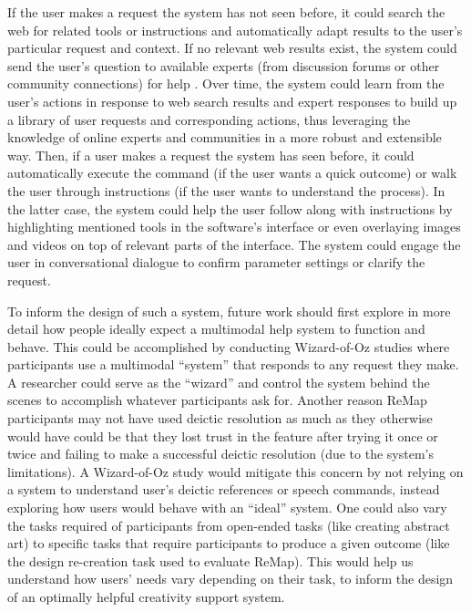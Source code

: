 If the user makes a request the system has not seen before, it could search the web for related tools or instructions and automatically adapt results to the user's particular request and context. If no relevant web results exist, the system could send the user's question to available experts (from discussion forums or other community connections) for help \cite{Ackerman1990, Chen2017, Kim2012}. Over time, the system could learn from the user's actions in response to web search results and expert responses to build up a library of user requests and corresponding actions, thus leveraging the knowledge of online experts and communities in a more robust and extensible way. Then, if a user makes a request the system has seen before, it could automatically execute the command (if the user wants a quick outcome) or walk the user through instructions (if the user wants to understand the process). In the latter case, the system could help the user follow along with instructions by highlighting mentioned tools in the software's interface or even overlaying images and videos on top of relevant parts of the interface. The system could engage the user in conversational dialogue to confirm parameter settings or clarify the request. 

To inform the design of such a system, future work should first explore in more detail how people ideally expect a multimodal help system to function and behave. This could be accomplished by conducting Wizard-of-Oz studies where participants use a multimodal ``system'' that responds to any request they make. A researcher could serve as the ``wizard'' and control the system behind the scenes to accomplish whatever participants ask for. Another reason ReMap participants may not have used deictic resolution as much as they otherwise would have could be that they lost trust in the feature after trying it once or twice and failing to make a successful deictic resolution (due to the system's limitations). A Wizard-of-Oz study would mitigate this concern by not relying on a system to understand user's deictic references or speech commands, instead exploring how users would behave with an ``ideal'' system. One could also vary the tasks required of participants from open-ended tasks (like creating abstract art) to specific tasks that require participants to produce a given outcome (like the design re-creation task used to evaluate ReMap). This would help us understand how users' needs vary depending on their task, to inform the design of an optimally helpful creativity support system.

